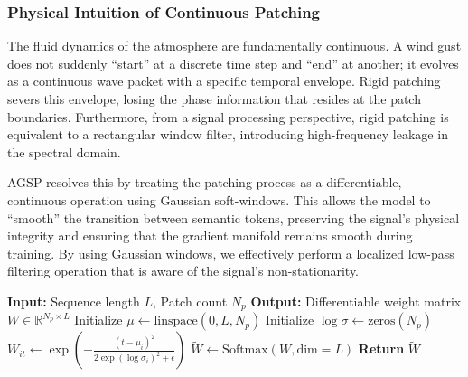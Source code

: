 \subsubsection{Physical Intuition of Continuous Patching}
\label{sec:agsp_intuition}
The fluid dynamics of the atmosphere are fundamentally continuous. A wind gust does not suddenly ``start'' at a discrete time step and ``end'' at another; it evolves as a continuous wave packet with a specific temporal envelope. Rigid patching severs this envelope, losing the phase information that resides at the patch boundaries. Furthermore, from a signal processing perspective, rigid patching is equivalent to a rectangular window filter, introducing high-frequency leakage in the spectral domain. 

AGSP resolves this by treating the patching process as a differentiable, continuous operation using Gaussian soft-windows. This allows the model to ``smooth'' the transition between semantic tokens, preserving the signal's physical integrity and ensuring that the gradient manifold remains smooth during training. By using Gaussian windows, we effectively perform a localized low-pass filtering operation that is aware of the signal's non-stationarity.

\begin{algorithm}[H]
\caption{AGSP Weight Computation}
\begin{algorithmic}[1]
\STATE \textbf{Input:} Sequence length $L$, Patch count $N_p$
\STATE \textbf{Output:} Differentiable weight matrix $W \in \mathbb{R}^{N_p \times L}$
\STATE Initialize $\mu \gets \text{linspace}(0, L, N_p)$
\STATE Initialize $\log \sigma \gets \text{zeros}(N_p)$
            \STATE $W_{it} \gets \exp\left( -\frac{(t-\mu_i)^2}{2\exp(\log \sigma_i)^2 + \epsilon} \right)$
        \ENDFOR
    \ENDFOR
    \STATE $\tilde{W} \gets \text{Softmax}(W, \text{dim}=L)$ 
    \STATE \textbf{Return} $\tilde{W}$
\ENDFOR
\end{algorithmic}
\label{alg:agsp_weights}
\end{algorithm}

